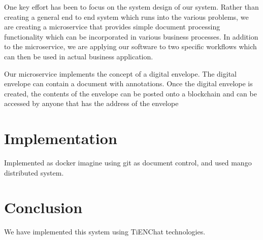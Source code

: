 \documentclass[journal]{IEEEtran}
\begin{document}
One key effort has been to focus on the system design of our system.
Rather than creating a general end to end system which runs into the
various problems, we are creating a microservice that provides simple
document processing functionality which can be incorporated in various
business processes.  In addition to the microservice, we are applying
our software to two specific workflows which can then be used in
actual business application.

Our microservice implements the concept of a digital envelope.  The
digital envelope can contain a document with annotations.  Once the
digital envelope is created, the contents of the envelope can be
posted onto a blockchain and can be accessed by anyone that has the
address of the envelope 



\section{Implementation}

Implemented as docker imagine using git as document control, and used
mango distributed system.

\section{Conclusion}
We have implemented this system using TiENChat technologies.
\end{document}
